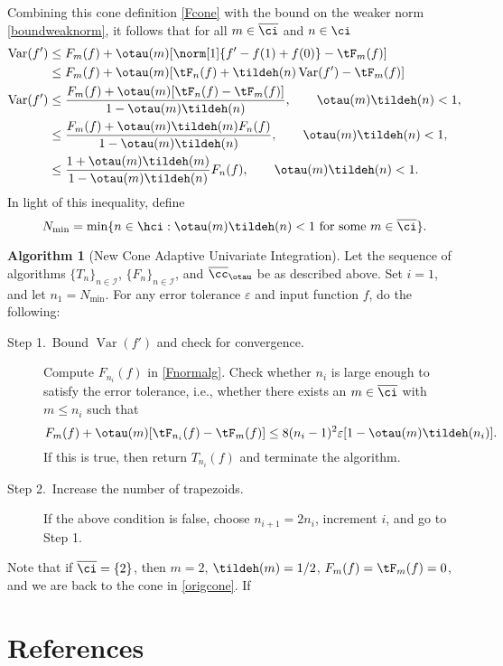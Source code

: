 \documentclass[]{elsarticle}
\DeclareMathOperator{\Var}{Var}
\newcommand{\occ}{\overline{\cc}}
\newcommand{\oci}{\overline{\ci}}
\theoremstyle{definition}
\newtheorem{algo}{Algorithm}
\theoremstyle{remark}
\begin{document}
Combining this cone definition \eqref{Fcone} with the bound on the weaker norm \eqref{boundweaknorm}, it follows that for all $m \in 
\oci$ and $n \in \ci$
\begin{align*}
\Var(f') & \le F_m(f) + \otau(m) [\norm[1]{f' - f(1)+f(0)}- \tF_m(f)]\\
& \le F_m(f) + \otau(m) [\tF_n(f) + \tildeh(n) \Var(f') - \tF_m(f)]\\
\Var(f') 
& \le  \frac{F_m(f) + \otau(m) [\tF_n(f) - \tF_m(f)]}{1-\otau(m) \tildeh(n)}, \qquad \otau(m) \tildeh(n) < 1, \\
& \le  \frac{F_m(f) + \otau(m) \tildeh(m) F_n(f)}{1-\otau(m) \tildeh(n)}, \qquad \otau(m) \tildeh(n) < 1, \\
& \le  \frac{1 + \otau(m) \tildeh(m)}{1-\otau(m) \tildeh(n)} F_n(f), \qquad \otau(m) \tildeh(n) < 1.
\end{align*}
In light of this inequality, define
\[
N_{\min} = \min \{ n \in \hci : \otau(m) \tildeh(n) < 1 \text{ for some } m \in \oci \}.
\]

\begin{algo}[New Cone Adaptive Univariate Integration] \label{newconealgo}
Let the sequence of algorithms $\{T_n\}_{n\in \mathcal{I}}$, $\{F_n\}_{n\in \mathcal{I}}$, and $\occ_{\otau}$ be as described above.  Set $i=1$, and let $n_1=N_{\min}$. For any error tolerance $\varepsilon$ and input function $f$, do the following:
\begin{description}
\item[Step 1.\ Bound {$\Var(f')$} and check for convergence.] Compute $F_{n_i}(f)$ in \eqref{Fnormalg}.  Check whether $n_i$ is large enough to satisfy the error tolerance, i.e., whether there exists an $m\in \oci$ with $m \le n_i$ such that
    \begin{equation*}
      F_m(f) + \otau(m) [\tF_{n_i}(f) - \tF_m(f)] \le 8 (n_i-1)^2 \varepsilon [1-\otau(m) \tildeh(n_i)].
    \end{equation*}
If this is true, then return $T_{n_i}(f)$ and terminate the algorithm.   

\item[Step 2.\ Increase the number of trapezoids.]  If the above condition is false, choose $n_{i+1}=2n_i$, increment $i$, and go to Step 1.
\end{description}
\end{algo}

Note that if $\oci=\{2\}$, then $m=2$, $\tildeh(m)=1/2$, $F_m(f)=\tF_m(f)=0$, and we are back to the cone in \eqref{origcone}.  If 

\section*{References}

%

\end{document}
